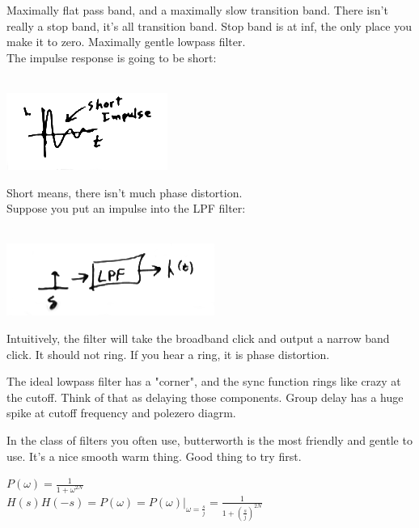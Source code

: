 Maximally flat pass band, and a maximally slow transition band. There
isn't really a stop band, it's all transition band. Stop band is at inf, the
only place you make it to zero. Maximally gentle lowpass filter.  \\

The impulse response is going to be short:

 \\
\includegraphics[scale=0.5]{frames/15c}

Short means, there isn't much phase distortion. \\

Suppose you put an impulse into the LPF filter: 

 \\
\includegraphics[scale=0.5]{frames/15d}

Intuitively, the filter will take the broadband click and output a narrow
band click. It should not ring. If you hear a ring, it is phase distortion. 

The ideal lowpass filter has a "corner", and the sync function rings like
crazy at the cutoff. Think of that as delaying those components. 
Group delay has a huge spike at cutoff frequency and polezero diagrm.


In the class of filters you often use, butterworth is the most friendly and
gentle to use. It's a nice smooth warm thing. Good thing to try first. 

$P(\omega) = \frac{1}{1 + \omega^{2N}}$ \\
$H(s)H(-s) = P(\omega) = P(\omega) \vert_{\omega = \frac{s}{j}}
= \frac{1}{1 + (\frac{s}{j})^{2N}}
$ \\

